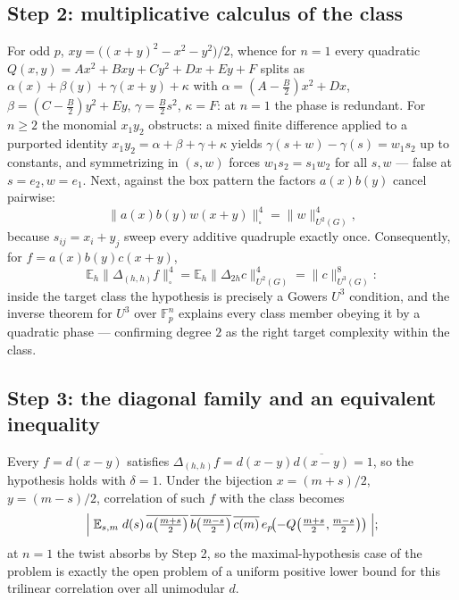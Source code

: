 \documentclass[11pt]{article}
\begin{document}
\subsection{Step 2: multiplicative calculus of the class}
For odd $p$, $xy=\bigl((x+y)^2-x^2-y^2\bigr)/2$, whence for $n=1$ every
quadratic $Q(x,y)=Ax^2+Bxy+Cy^2+Dx+Ey+F$ splits as
$\alpha(x)+\beta(y)+\gamma(x+y)+\kappa$ with
$\alpha=(A-\tfrac{B}{2})x^2+Dx$, $\beta=(C-\tfrac{B}{2})y^2+Ey$,
$\gamma=\tfrac{B}{2}s^2$, $\kappa=F$: at $n=1$ the phase is redundant. For
$n\ge2$ the monomial $x_1y_2$ obstructs: a mixed finite difference applied to
a purported identity $x_1y_2=\alpha+\beta+\gamma+\kappa$ yields
$\gamma(s+w)-\gamma(s)=w_1s_2$ up to constants, and symmetrizing in $(s,w)$
forces $w_1s_2=s_1w_2$ for all $s,w$ — false at $s=e_2,w=e_1$. Next, against
the box pattern the factors $a(x)b(y)$ cancel pairwise:
\[
\|a(x)b(y)w(x+y)\|_\square^4=\|w\|_{U^2(G)}^4 ,
\]
because $s_{ij}=x_i+y_j$ sweep every additive quadruple exactly once.
Consequently, for $f=a(x)b(y)c(x+y)$,
\[
\mathbb{E}_h\|\Delta_{(h,h)}f\|_\square^4
=\mathbb{E}_h\|\Delta_{2h}c\|_{U^2(G)}^4=\|c\|_{U^3(G)}^8 :
\]
inside the target class the hypothesis is precisely a Gowers $U^3$ condition,
and the inverse theorem for $U^3$ over $\mathbb{F}_p^n$ explains every class
member obeying it by a quadratic phase — confirming degree $2$ as the right
target complexity within the class.

\subsection{Step 3: the diagonal family and an equivalent inequality}
Every $f=d(x-y)$ satisfies $\Delta_{(h,h)}f=d(x-y)\overline{d(x-y)}=1$, so the
hypothesis holds with $\delta=1$. Under the bijection
$x=(m+s)/2$, $y=(m-s)/2$, correlation of such $f$ with the class becomes
\[
\Bigl|\;\mathbb{E}_{s,m}\;
d(s)\,\overline{a\bigl(\tfrac{m+s}{2}\bigr)}\,
\overline{b\bigl(\tfrac{m-s}{2}\bigr)}\,\overline{c(m)}\,
e_p\!\bigl(-Q\bigl(\tfrac{m+s}{2},\tfrac{m-s}{2}\bigr)\bigr)\;\Bigr| ;
\]
at $n=1$ the twist absorbs by Step 2, so the maximal-hypothesis case of the
problem is exactly the open problem of a uniform positive lower bound for this
trilinear correlation over all unimodular $d$.
\end{document}
